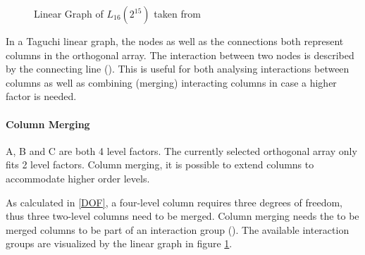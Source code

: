 \begin{figure}[H]
	\label{figure:hyperparameter_tuning:linear_graph}
	\centering
{}
\caption{Linear Graph of $L_{16}(2^{15})$ taken from \cite{yang_design_2009}}
\end{figure}

In a Taguchi linear graph, the nodes as well as the connections both represent columns in the orthogonal array. The interaction between two nodes is described by the connecting line (\cite{taguchi_taguchis_2005}). This is useful for both analysing interactions between columns as well as combining (merging) interacting columns in case a higher factor is needed.

\paragraph{Column Merging}
A, B and C are both 4 level factors. The currently selected orthogonal array only fits 2 level factors. Column merging, it is possible to extend columns to accommodate higher order levels. 

As calculated in \ref{DOF}, a four-level column requires three degrees of freedom, thus three two-level columns need to be merged. Column merging needs the to be merged columns to be part of an interaction group (\cite{yang_design_2009}). The available interaction groups are visualized by the linear graph in figure \ref{figure:hyperparameter_tuning:linear_graph}.

